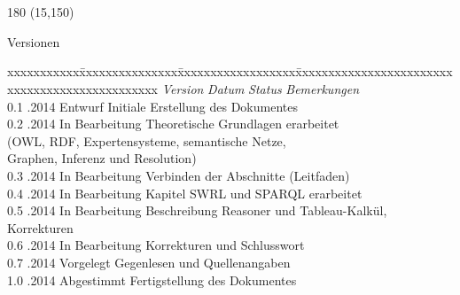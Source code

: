
\chapter*{}
\label{chap:versionen}

\begin{textblock}{180} (15,150)
\color{black}
\begin{huge}
Versionen
\end{huge}
\vspace{10mm}

\fontsize{10pt}{18pt}\selectfont
\begin{tabbing}
xxxxxxxxxxx\=xxxxxxxxxxxxxxx\=xxxxxxxxxxxxxxxxxx\=xxxxxxxxxxxxxxxxxxxxxxxxxxxxxxxxxxxxxxxxxxxxxxx \kill
\textit{Version}    \> \textit{Datum}   \> \textit{Status}      \> \textit{Bemerkungen}\\
0.1                 .2014       \> Entwurf              \> Initiale Erstellung des Dokumentes\\
0.2                 .2014       \> In Bearbeitung       \> Theoretische Grundlagen erarbeitet \\
                    \>                  \>                      \> (OWL, RDF, Expertensysteme, semantische Netze, \\
                    \>                  \>                      \> Graphen, Inferenz und Resolution)\\
0.3                 .2014       \> In Bearbeitung       \> Verbinden der Abschnitte (Leitfaden)\\
0.4                 .2014       \> In Bearbeitung       \> Kapitel SWRL und SPARQL erarbeitet\\
0.5                 .2014       \> In Bearbeitung       \> Beschreibung Reasoner und Tableau-Kalkül, Korrekturen\\
0.6                 .2014       \> In Bearbeitung       \> Korrekturen und Schlusswort\\
0.7                 .2014       \> Vorgelegt            \> Gegenlesen und Quellenangaben\\
1.0                 .2014       \> Abgestimmt           \> Fertigstellung des Dokumentes\\
\end{tabbing}

\end{textblock}
